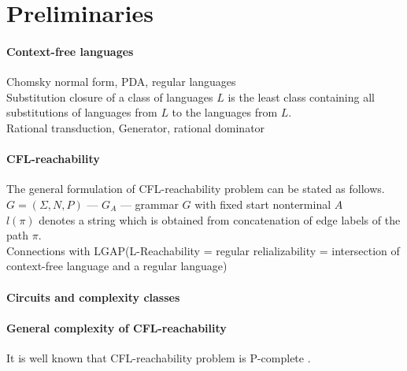 \section{Preliminaries}
\label{sec:prel}
\label{preliminaries}
\paragraph{Context-free languages} 
Chomsky normal form, PDA, regular languages
\\Substitution closure of a class of languages $L$ is the least class containing all substitutions of languages from $L$ to the languages from $L$.
\\Rational transduction, Generator, rational dominator
\paragraph{CFL-reachability} 
The general formulation of CFL-reachability problem can be stated as follows.
$G = (\Sigma, N, P)$ --- $G_A$ --- grammar $G$ with fixed start nonterminal $A$
\\$l(\pi)$ denotes a string which is obtained from concatenation of edge labels of the path $\pi$.
\\Connections with LGAP(L-Reachability = regular relializability = intersection of context-free language and a regular language)
\paragraph{Circuits and complexity classes} 
\paragraph{General complexity of CFL-reachability} It is well known that CFL-reachability problem is P-complete \cite{Yannakakis}. 

